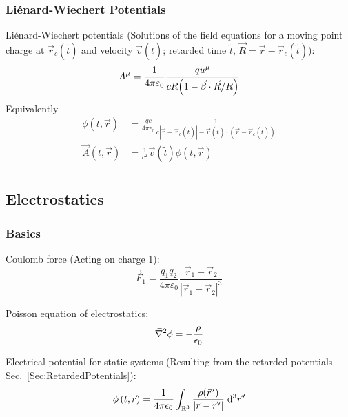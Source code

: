 		\subsubsection{Liénard-Wiechert Potentials}
			\noindent
			Liénard-Wiechert potentials (Solutions of the field equations for a moving point charge at $\vec{r}_c(\tilde{t})$ and velocity $\vec{v}(\tilde{t})$; retarded time $\tilde{t}$, $\vec{R}= \vec{r}-\vec{r}_c(\tilde{t})$):
			\begin{equation}
				A^\mu = \frac{1}{4\pi\varepsilon_0} \frac{q u^\mu}{c R \qty(1 - \vec{\beta}\cdot\vec{R}/R) }
			\end{equation}
			Equivalently
			\begin{equation}
				\begin{aligned}
					\phi(t,\vec{r}) & =\frac{q c}{4\pi \epsilon_0}\frac{1}{c \left|\vec{r}-\vec{r}_c(\tilde{t})\right|-\vec{v}(\tilde{t})\cdot\left(\vec{r}-\vec{r}_c(\tilde{t})\right)} \\
					\vec{A}(t,\vec{r}) &= \frac{1}{c^2}\vec{v}(\tilde{t})\phi(t,\vec{r}) \\
				\end{aligned}
			\end{equation}

	\subsection{Electrostatics}
		\subsubsection{Basics}
			\noindent
			Coulomb force (Acting on charge 1):
			\begin{equation}
				\vec{F}_1 = \frac{q_1 q_2}{4\pi\varepsilon_0}\frac{\vec{r}_1-\vec{r}_2}{\left|\vec{r}_1-\vec{r}_2\right|^3}
			\end{equation}

			\noindent
			Poisson equation of electrostatics:
			\begin{equation}
				\vec{\nabla}^2\phi = -\frac{\rho}{\epsilon_0}
				\label{Eq:Poisson}
			\end{equation}

			\noindent
			Electrical potential for static systems (Resulting from the retarded potentials Sec.~\ref{Sec:RetardedPotentials}):
			\begin{equation}
				\phi\left(t,\vec{r}\right)
				= \frac{1}{4\pi\epsilon_0} \int_{\mathbb{R}^3} \frac{\rho(\pvec{r}')}{\left|\vec{r}-\pvec{r}'\right|}\;\dd^3 \pvec{r}'
			\end{equation}

